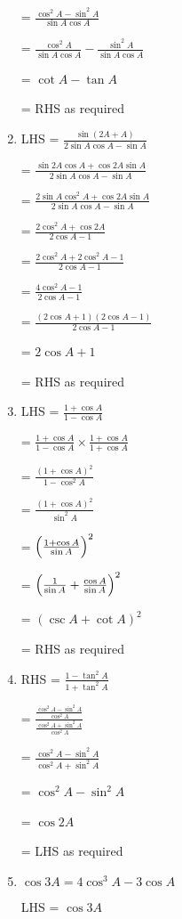 \documentclass[../main.tex]{subfiles}
\begin{document}
\begin{enumerate}
    = $\frac{\cos^2{A}-\sin^2{A}}{\sin{A}\cos{A}}$

    = $\frac{\cos^2{A}}{\sin{A}\cos{A}}-\frac{\sin^2{A}}{\sin{A}\cos{A}}$

    = $\cot{A}-\tan{A}$

    = RHS as required

    \item LHS = $\frac{\sin{(2A+A)}}{2\sin{A}\cos{A}-\sin{A}}$

    = $\frac{\sin{2A}\cos{A}+\cos{2A}\sin{A}}{2\sin{A}\cos{A}-\sin{A}}$

    = $\frac{2\sin{A}\cos^2{A}+\cos{2A}\sin{A}}{2\sin{A}\cos{A}-\sin{A}}$

    = $\frac{2\cos^2{A}+\cos{2A}}{2\cos{A}-1}$

    = $\frac{2\cos^2{A}+2\cos^2{A}-1}{2\cos{A}-1}$

    = $\frac{4\cos^2{A}-1}{2\cos{A}-1}$

    = $\frac{(2\cos{A}+1)(2\cos{A}-1)}{2\cos{A}-1}$

    = $2\cos{A}+1$

    = RHS as required

    \item LHS = $\frac{1+\cos{A}}{1-\cos{A}}$

    = $\frac{1+\cos{A}}{1-\cos{A}}\times \frac{1+\cos{A}}{1+\cos{A}}$

    = $\frac{(1+\cos{A})^2}{1-\cos^2{A}}$

    = $\frac{(1+\cos{A})^2}{\sin^2{A}}$

    = $\Bigl(\frac{1+\cos{A}}{\sin{A}}\Bigr)^2$

    = $\Bigl(\frac{1}{\sin{A}}+\frac{\cos{A}}{\sin{A}}\Bigr)^2$

    = $(\csc{A}+\cot{A})^2$

    = RHS as required

    \item RHS = $\frac{1-\tan^2{A}}{1+\tan^2{A}}$

    = $\frac{\frac{\cos^2{A}-\sin^2{A}}{\cos^2{A}}}{\frac{\cos^2{A}+\sin^2{A}}{\cos^2{A}}}$

    = $\frac{\cos^2{A}-\sin^2{A}}{\cos^2{A}+\sin^2{A}}$

    = $\cos^2{A}-\sin^2{A}$

    = $\cos{2A}$

    = LHS as required

    \item $\cos{3A}=4\cos^3{A}-3\cos{A}$
    
    LHS = $\cos{3A}$


\end{enumerate}
\end{document}
